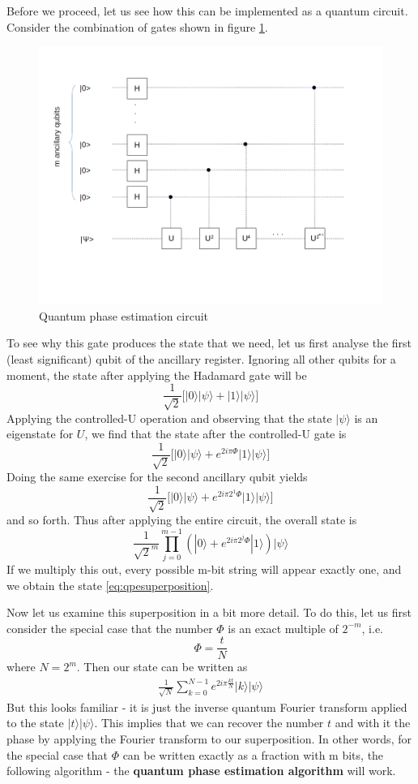 \documentclass[a4paper, draft]{article}
\theoremstyle{own}
\theoremstyle{remark}
\begin{document}
Before we proceed, let us see how this can be implemented as a quantum circuit. Consider the combination of gates  shown in figure \ref{fig:QPECircuit}.

\begin{figure}[ht]
\centering
\includegraphics[width=0.7\linewidth]{images/QPECircuit}
\caption[Quantum phase estimation circuit]{Quantum phase estimation circuit}
\label{fig:QPECircuit}
\end{figure}

To see why this gate produces the state that we need, let us first analyse the first (least significant) qubit of the ancillary register. Ignoring all other qubits for a moment, the state after applying the Hadamard gate will be
$$
\frac{1}{\sqrt{2}} \big[ |0\rangle |\psi \rangle + |1 \rangle |\psi \rangle \big] 
$$
Applying the controlled-U operation and observing that the state $|\psi \rangle$ is an eigenstate for $U$, we find that the state after the controlled-U gate is
$$
\frac{1}{\sqrt{2}} \big[ |0\rangle |\psi \rangle + e^{2i\pi \Phi}|1 \rangle |\psi \rangle \big] 
$$
Doing the same exercise for the second ancillary qubit yields 
$$
\frac{1}{\sqrt{2}} \big[ |0\rangle |\psi \rangle + e^{2i\pi 2^1 \Phi}|1 \rangle |\psi \rangle \big] 
$$
and so forth. Thus after applying the entire circuit, the overall state is
$$
\frac{1}{\sqrt{2}^m} \prod_{j=0}^{m-1} (|0 \rangle + e^{2i \pi 2^j \Phi} |1 \rangle ) |\psi \rangle
$$
If we multiply this out, every possible m-bit string will appear exactly one, and we obtain the state \eqref{eq:qpesuperposition}. 

Now let us examine this superposition in a bit more detail. To do this, let us first consider the special case that the number $\Phi$ is an exact multiple of $2^{-m}$, i.e.
$$
\Phi = \frac{t}{N}
$$
where $N = 2^{m}$. Then our state can be written as
\begin{align*}
\frac{1}{\sqrt{N}} \sum_{k = 0}^{N - 1} e^{2i\pi \frac{kt}{N}} |k \rangle |\psi \rangle
\end{align*}
But this looks familiar - it is just the inverse quantum Fourier transform applied to the state $|t \rangle |\psi \rangle$. This implies that we can recover the number $t$ and with it the phase by applying the Fourier transform to our superposition. In other words, for the special case that $\Phi$ can be written exactly as a fraction with m bits, the following algorithm - the {\bf quantum phase estimation algorithm} will work.
\end{document}
